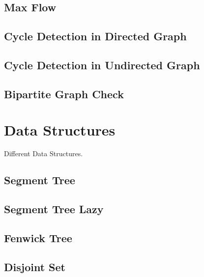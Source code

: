 \documentclass[10pt, a4paper,twocolumn]{article}
\begin{document}
\subsection{Max Flow}


\subsection{Cycle Detection in Directed Graph}


\subsection{Cycle Detection in Undirected Graph}


\subsection{Bipartite Graph Check}


\section{Data Structures}
Different Data Structures.

\subsection{Segment Tree}


\subsection{Segment Tree Lazy}


\subsection{Fenwick Tree}


\subsection{Disjoint Set}

\end{document}
